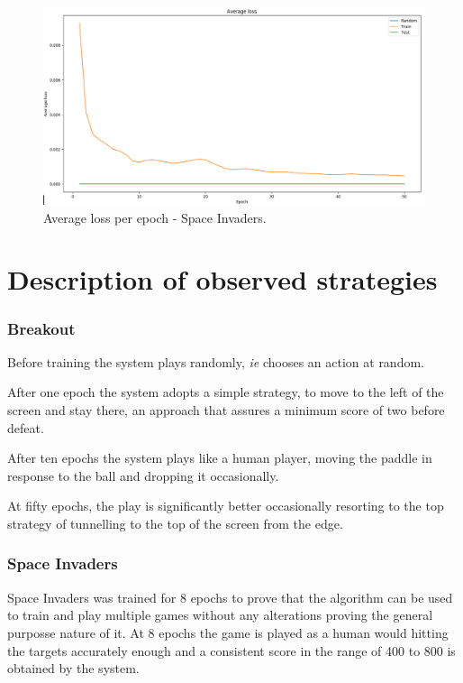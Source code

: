 \documentclass[a4paper,12pt]{report}
\begin{document}
			\begin{figure}[H]
				\begin{centering}
					\includegraphics[width=15cm]{images/space_4_averageloss.png}
					\caption{Average loss per epoch - Space Invaders.}
				\end{centering}
			\end{figure}			
			
		\section{Description of observed strategies}
			\subsubsection{Breakout}
				Before training the system plays randomly, \emph{ie} chooses an action at random. 

				After one epoch the system adopts a simple strategy, to move to the left of the screen and stay there, an approach that assures a minimum score of two before defeat.

				After ten epochs the system plays like a human player, moving the paddle in response to the ball and dropping it occasionally.

				At fifty epochs, the play is significantly better occasionally resorting to the top strategy of tunnelling to the top of the screen from the edge.

			\subsubsection{Space Invaders}
				Space Invaders was trained for 8 epochs to prove that the algorithm can be used to train and play multiple games without any alterations proving the general purposse nature of it. At 8 epochs the game is played as a human would hitting the targets accurately enough and a consistent score in the range of 400 to 800 is obtained by the system.
\end{document}
